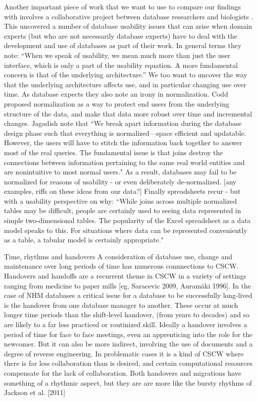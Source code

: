 Another important piece of work that we want to use to compare our findings with involves a collaborative project between database researchers and biologists   \cite{jagadish2007making}. This uncovered a number of database usability issues that can arise when domain experts (but who are not necessarily  database experts) have to deal with the development and use of databases as part of their work. In general terms they note: “When we speak of usability, we mean much more than just the user interface, which is only a part of the usability equation. A more fundamental concern is that of the underlying architecture.” We too want to uncover the way that the underlying architecture affects use, and in particular changing use over time. As database expects they also note an irony in normalization. Codd proposed normalization as a way to protect end users from the underlying structure of the data, and make that data more robust over time and incremental changes. Jagadish note that “We break apart information during the database design phase such that everything is normalized—space efficient and updatable. However, the users will have to stitch the information back together to answer most of the real queries. The fundamental issue is that joins destroy the connections between information pertaining to the same real world entities and are nonintuitive to most normal users." As a result, databases may fail to be normalized for reasons of usability - or even deliberately de-normalized. [any examples, riffs on these ideas from our data?] Finally spreadsheets recur - but with a usability perspective on why: “While joins across multiple normalized tables may be difficult, people are certainly used to seeing data represented in simple two-dimensional tables. The popularity of the Excel spreadsheet as a data model speaks to this. For situations where data can be represented conveniently as a table, a tabular model is certainly appropriate."

Time, rhythms and handovers
A consideration of database use, change and maintenance over long periods of time has numerous connnections to CSCW. Handovers and handoffs are a recurrent theme in CSCW in a variety of settings ranging from medicine to paper mills [eg, Saracevic 2009, Auramäki 1996]. In the case of NHM databases a critical issue for a database to be successfully long-lived is the handover from one database manager to another. These occur at much longer time periods than the shift-level handover, (from years to decades) and so are likely to a far less practiced or routinized skill. Ideally a handover involves a period of time for face to face meetings, even an apprenticing into the role for the newcomer. But it can also be more indirect, involving the use of documents and a degree of reverse engineering. In problematic cases it is a kind of CSCW where there is far less collaboration than is desired, and certain computational resources compensate for the lack of collaboration. Both handovers and migrations have something of a rhythmic aspect, but they are are more like the bursty rhythms of Jackson et al. [2011]

